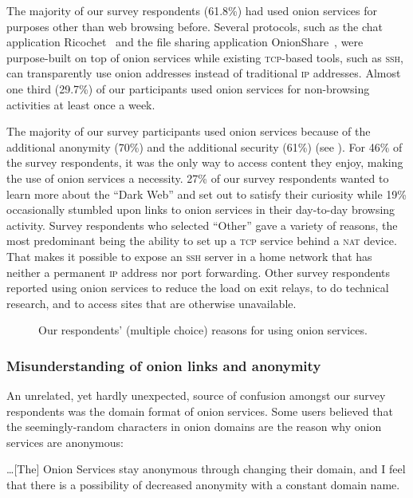 The majority of our survey respondents (61.8\%) had used onion services for purposes
other than web browsing before.  Several protocols, such as the chat application
Ricochet~\cite{ricochet} and the file sharing application
OnionShare~\cite{onionshare}, were purpose-built on top of onion services while
existing \textsc{tcp}-based tools, such as \textsc{ssh}, can transparently use
onion addresses instead of traditional \textsc{ip} addresses.  Almost one third
(29.7\%) of our participants used onion services for non-browsing activities at
least once a week. 

The majority of our survey participants  used onion services
because of the additional anonymity (70\%) and the additional security (61\%) (see ).
For 46\% of the survey respondents, it was the only way to access content they enjoy, making the use of
onion services a necessity.  27\% of our survey respondents wanted to learn more about
the ``Dark Web'' and set out to satisfy their curiosity while 19\% occasionally
stumbled upon links to onion services in their day-to-day browsing activity.
Survey respondents who selected ``Other'' gave a variety of reasons, the most
predominant being the ability to set up a \textsc{tcp} service behind a
\textsc{nat} device.  That makes it possible to expose an \textsc{ssh} server in
a home network that has neither a permanent \textsc{ip} address nor port
forwarding.  Other survey respondents reported using onion services to reduce the load on exit relays, to do
technical research, and to access sites that are otherwise unavailable.

\begin{figure}[t]
    \centering
    
    \caption{Our respondents' (multiple choice) reasons for using onion
    services.}
    \label{fig:onion-usage}
\end{figure}


\subsubsection{Misunderstanding of onion links and anonymity}
An unrelated, yet hardly unexpected, source of confusion amongst our survey respondents was the domain format of
onion services.  Some users believed that the seemingly-random
characters in onion domains are the reason why onion services are anonymous:

\begin{displayquote}
\ldots [The] Onion Services stay anonymous through changing their domain, and I
feel that there is a possibility of decreased anonymity with a constant domain
name.
\end{displayquote}

